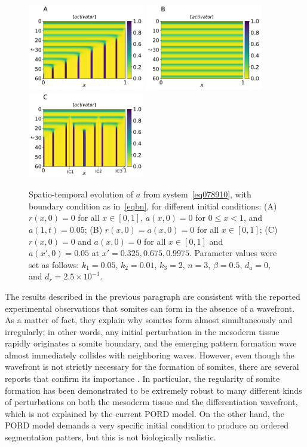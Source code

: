 \documentclass[11pt]{article}
\begin{document}
	\begin{figure}[t!]
		\centering
		\includegraphics[width=2in]{Figures/Fig02aRev.pdf}
		\includegraphics[width=2in]{Figures/Fig02bRev.pdf}
		\includegraphics[width=2in]{Figures/Fig02cRev.pdf}
		\caption{Spatio-temporal evolution of $a$ from system~\eqref{eq078910}, with
			boundary condition as in~\eqref{eqbn}, for different initial conditions: (A)
			$r(x, 0)=0$ for all $x\in[0,1]$, $a(x, 0)=0$ for $0\leq x<1$, and $a(1, t) =
			0.05$; (B) $r(x, 0) = a(x, 0)=0$ for all $x\in[0,1]$; (C) $r(x, 0)=0$ and $a(x,
			0)=0$ for all $x\in[0,1]$ and $a(x',0)=0.05$ at $x'=0.325, 0.675, 0.9975$.
			Parameter values were set as follows: $k_1=0.05$, $k_2=0.01$, $k_3=2$, $n=3$,
			$\beta=0.5$, $d_a=0$, and $d_r=2.5\times10^{-3}$.}
		\label{Fig02}
	\end{figure}
	
	The results described in the previous paragraph are consistent with the reported
	experimental observations that somites can form in the absence of a wavefront.
	As a matter of fact, they explain why somites form almost simultaneously and
	irregularly; in other words, any initial perturbation in the mesoderm tissue
	rapidly originates a somite boundary, and the emerging pattern formation wave
	almost immediately collides with neighboring waves. However, even though the
	wavefront is not strictly necessary for the formation of somites, there are
	several reports that confirm its importance
	\citep{Sawada2001, Naiche2011} . In particular, the regularity of somite
	formation has been demonstrated to be extremely robust to many different kinds
	of perturbations on both the mesoderm tissue and the differentiation wavefront,
	which is not explained by the current PORD model. On the other hand, the PORD 
	model demands a very specific initial condition to produce an ordered 
	segmentation patters, but this is not biologically realistic.
	
\end{document}
